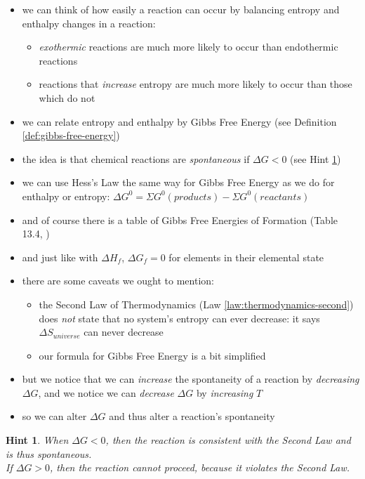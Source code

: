\documentclass[11pt, oneside]{article}   	%
\newtheorem{hint}{Hint}
\begin{document}
\begin{itemize}
\item we can think of how easily a reaction can occur by balancing entropy and enthalpy changes in a reaction:
\begin{itemize}
\item \emph{exothermic} reactions are much more likely to occur than endothermic reactions
\item reactions that \emph{increase} entropy are much more likely to occur than those which do not
\end{itemize}
\item we can relate entropy and enthalpy by Gibbs Free Energy (see Definition \ref{def:gibbs-free-energy})
\item the idea is that chemical reactions are \emph{spontaneous} if $\Delta G < 0$ (see Hint \ref{hint:gibbs-free-energy:spontaneity})
\item we can use Hess's Law the same way for Gibbs Free Energy as we do for enthalpy or entropy: $\Delta G^{0} = \Sigma  G^{0} (products) -  \Sigma  G^{0} (reactants)$
\item and of course there is a table of Gibbs Free Energies of Formation (Table 13.4, \cite[p. 447]{wile-chem-2})
\item and just like with $\Delta H_f$, $\Delta G_f = 0$ for elements in their elemental state 
\item there are some caveats we ought to mention:
\begin{itemize}
\item the Second Law of Thermodynamics (Law \ref{law:thermodynamics-second}) does \emph{not} state that no system's entropy can ever decrease: it says $\Delta S_{universe}$ can never decrease
\item our formula for Gibbs Free Energy is a bit simplified
\end{itemize}
\item but we notice that we can \emph{increase} the spontaneity of a reaction by \emph{decreasing} $\Delta G$, and we notice we can \emph{decrease} $\Delta G$ by \emph{increasing} $T$
\item so we can alter $\Delta G$ and thus alter a reaction's spontaneity
\end{itemize}

\begin{hint}\label{hint:gibbs-free-energy:spontaneity}
When $\Delta G < 0$, then the reaction is consistent with the Second Law and is thus spontaneous.\\
If $\Delta G > 0$, then the reaction cannot proceed, because it violates the Second Law.
\end{hint}
\end{document}
